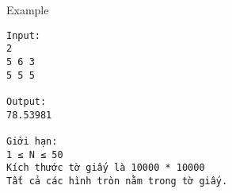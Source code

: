 Example
\begin{verbatim}
Input:
2
5 6 3
5 5 5

Output:
78.53981

Giới hạn:
1 ≤ N ≤ 50
Kích thước tờ giấy là 10000 * 10000
Tất cả các hình tròn nằm trong tờ giấy.
\end{verbatim}